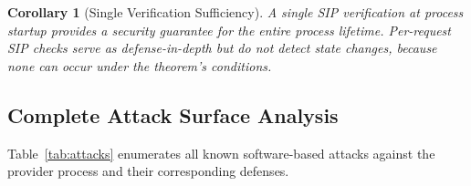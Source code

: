 \documentclass[10pt,twocolumn,letterpaper]{article}
\newtheorem{corollary}{Corollary}
\begin{document}
\begin{corollary}[Single Verification Sufficiency]
\label{cor:single-check}
A single SIP verification at process startup provides a security guarantee for the entire process lifetime. Per-request SIP checks serve as defense-in-depth but do not detect state changes, because none can occur under the theorem's conditions.
\end{corollary}

\subsection{Complete Attack Surface Analysis}

Table~\ref{tab:attacks} enumerates all known software-based attacks against the provider process and their corresponding defenses.
\end{document}
